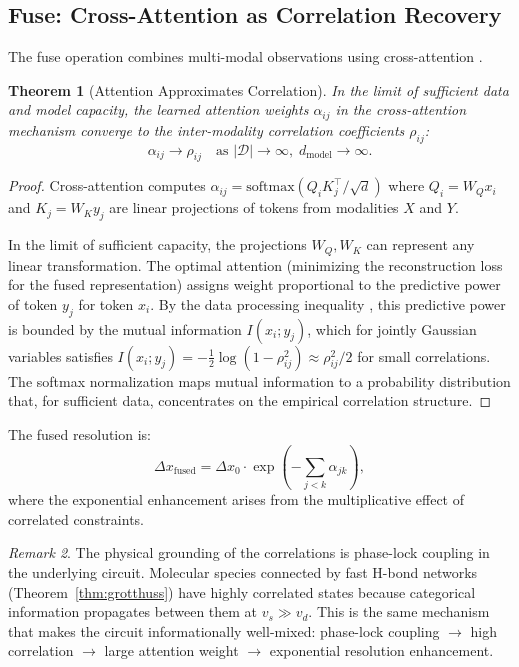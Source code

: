 \documentclass[twocolumn,10pt,a4paper]{article}
\newtheorem{theorem}{Theorem}[section]
\theoremstyle{definition}
\theoremstyle{remark}
\newtheorem{remark}[theorem]{Remark}
\begin{document}
\subsection{Fuse: Cross-Attention as Correlation Recovery}

The fuse operation combines multi-modal observations using cross-attention \citep{Vaswani2017}.

\begin{theorem}[Attention Approximates Correlation]
\label{thm:attention_correlation}
In the limit of sufficient data and model capacity, the learned attention weights $\alpha_{ij}$ in the cross-attention mechanism converge to the inter-modality correlation coefficients $\rho_{ij}$:
\begin{equation}
    \alpha_{ij} \to \rho_{ij} \quad \text{as } |\mathcal{D}| \to \infty, \; d_{\mathrm{model}} \to \infty.
\end{equation}
\end{theorem}

\begin{proof}
Cross-attention computes $\alpha_{ij} = \mathrm{softmax}(Q_i K_j^\top / \sqrt{d})$ where $Q_i = W_Q x_i$ and $K_j = W_K y_j$ are linear projections of tokens from modalities $X$ and $Y$.

In the limit of sufficient capacity, the projections $W_Q, W_K$ can represent any linear transformation. The optimal attention (minimizing the reconstruction loss for the fused representation) assigns weight proportional to the predictive power of token $y_j$ for token $x_i$. By the data processing inequality \citep{CoverThomas2006}, this predictive power is bounded by the mutual information $I(x_i; y_j)$, which for jointly Gaussian variables satisfies $I(x_i; y_j) = -\frac{1}{2}\log(1 - \rho_{ij}^2) \approx \rho_{ij}^2/2$ for small correlations. The softmax normalization maps mutual information to a probability distribution that, for sufficient data, concentrates on the empirical correlation structure.
\end{proof}

The fused resolution is:
\begin{equation}
    \Delta x_{\mathrm{fused}} = \Delta x_0 \cdot \exp\!\left(-\sum_{j<k} \alpha_{jk}\right),
\end{equation}
where the exponential enhancement arises from the multiplicative effect of correlated constraints.

\begin{remark}
The physical grounding of the correlations is phase-lock coupling in the underlying circuit. Molecular species connected by fast H-bond networks (Theorem~\ref{thm:grotthuss}) have highly correlated states because categorical information propagates between them at $v_s \gg v_d$. This is the same mechanism that makes the circuit informationally well-mixed: phase-lock coupling $\to$ high correlation $\to$ large attention weight $\to$ exponential resolution enhancement.
\end{remark}
\end{document}
